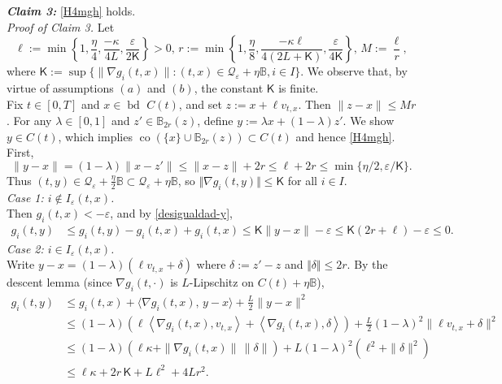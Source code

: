 \documentclass[preprint,12pt]{elsarticle}
\renewcommand{\epsilon}{\varepsilon}
\newcommand{\bd}{{\operatorname{bd \ }}}
\theoremstyle{plain}
\theoremstyle{definition}
\theoremstyle{remark}
\begin{document}
\emph{\textbf{Claim 3:}} \ref{H4mgh} holds.\\ 
 \emph{Proof of Claim 3.} Let  
 $$
 \ell := \min\left\{1,\frac{\eta}{4},\frac{-\kappa}{4L},\frac{\epsilon}{2\mathsf{K}}\right\}>0,\, r := \min\left\{1,\frac{\eta}{8},\frac{-\kappa\ell}{4(2L+\mathsf{K})},\frac{\epsilon}{4\mathsf{K}}\right\},\, M := \frac{\ell}{r},
 $$
 where $\mathsf{K} := \sup\{\|\nabla g_i(t,x)\| : (t,x)\in \mathscr{Q}_\epsilon+\eta\mathbb{B},  i\in I\}$. We observe that, by virtue of assumptions $(a)$ and $(b)$,  the constant $\mathsf{K}$ is finite. \\
 Fix $t\in [0,T]$ and $x\in \bd C(t)$, and set $z := x+\ell v_{t,x}$. Then $\|z-x\|\leq Mr$. For any $\lambda\in [0,1]$ and $z'\in \mathbb{B}_{2r}(z)$, define $y := \lambda x + (1-\lambda)z'$. We show  $y\in C(t)$, which implies $\operatorname{co}(\{x\}\cup\mathbb{B}_{2r}(z))\subset C(t)$ and hence \ref{H4mgh}. First, 
 \begin{equation}\label{desigualdad-y}
 \|y-x\|= (1-\lambda)\|x-z'\|\leq \|x-z\| + 2r \leq \ell + 2r \leq \min\{\eta/2, \epsilon/\mathsf{K}\}.
 \end{equation}
 Thus $(t,y)\in \mathscr{Q}_\epsilon+\frac{\eta}{2} \mathbb{B}\subset \mathscr{Q}_\epsilon+\eta \mathbb{B}$, so $\Vert \nabla g_i(t,y)\Vert \leq \mathsf{K}$ for all $i\in I$.\\
 \noindent\emph{ Case 1: $i\notin I_\epsilon(t,x)$.} \\
 Then $g_i(t,x)<-\epsilon$, and by \eqref{desigualdad-y},
\begin{equation*}
	\begin{aligned}
		g_i(t,y)&\leq g_i(t,y) - g_i(t,x) + g_i(t,x)
        \leq \mathsf{K}\|y-x\| - \epsilon\leq \mathsf{K}(2r + \ell) - \epsilon \leq 0.
	\end{aligned}
\end{equation*}
\noindent\emph{Case 2: $i\in I_\epsilon(t,x)$.} \\
Write $y-x=(1-\lambda)(\ell v_{t,x}+\delta)$ where $\delta:=z'-z$ and $\Vert \delta\Vert \leq 2r$. By the descent lemma (since $\nabla g_i(t,\cdot)$ is $L$-Lipschitz on $C(t)+\eta\mathbb{B}$),
\begin{equation*}
\begin{aligned}
g_i(t,y)
&\leq g_i(t,x)+\langle \nabla g_i(t,x),\,y-x\rangle+\frac{L}{2}\|y-x\|^{2} \\
&\leq   (1-\lambda)\!\left(\ell\left\langle \nabla g_i(t,x), v_{t,x}\right\rangle
      + \left\langle \nabla g_i(t,x), \delta \right\rangle\right)
   + \frac{L}{2}(1-\lambda)^{2}\|\ell v_{t,x}+\delta\|^{2} \\
&\leq  (1-\lambda)\!\left(\ell \kappa + \|\nabla g_i(t,x)\|\,\|\delta\|\right)
   + L(1-\lambda)^{2}\!\left(\ell^{2} + \|\delta\|^{2}\right) \\
&\leq \ell \kappa + 2r\,\mathsf{K} + L\ell^{2} + 4L r^{2}.
\end{aligned}
\end{equation*}
\end{document}
